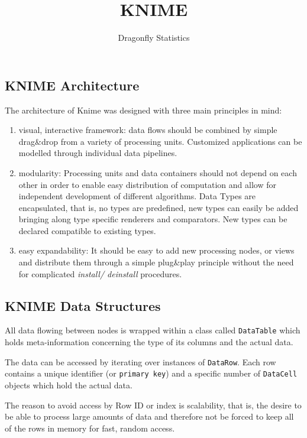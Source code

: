 \documentclass[11pt]{article} %
\title{KNIME}
\author{Dragonfly Statistics}
\begin{document}
\subsection*{KNIME Architecture} 
The architecture of Knime was designed with three main
principles in mind:
\begin{enumerate}
\item  visual, interactive framework: data flows should be combined
by simple drag\&drop from a variety of processing
units. Customized applications can be modelled through
individual data pipelines.
\item modularity: Processing units and data containers should
not depend on each other in order to enable easy distribution
of computation and allow for independent development
of different algorithms. Data Types are encapsulated,
that is, no types are predefined, new types can easily be
added bringing along type specific renderers and comparators.
New types can be declared compatible to existing
types.
\item  easy expandability: It should be easy to add new processing
nodes, or views and distribute them through a simple
plug\&play principle without the need for complicated \textit{install/
deinstall} procedures.
\end{enumerate}
\subsection*{KNIME Data Structures}
All data flowing between nodes is wrapped within a class
called \texttt{DataTable} which holds meta-information concerning
the type of its columns and the actual data. 

The data can
be accessed by iterating over instances of \texttt{DataRow}. Each
row contains a unique identifier (or \texttt{primary key}) and a
specific number of \texttt{DataCell} objects which hold the actual
data. 

The reason to avoid access by Row ID or index is
scalability, that is, the desire to be able to process large
amounts of data and therefore not be forced to keep all of
the rows in memory for fast, random access.
\end{document}

